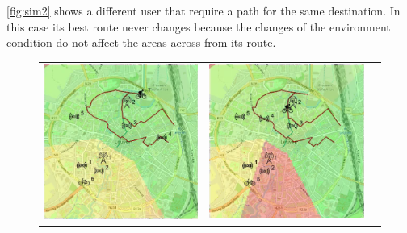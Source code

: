 \noindent \autoref{fig:sim2} shows a different user that require a path for the same destination. In this case its best route never changes because the changes of the environment condition do not affect the areas across from its route.
% 
\begin{figure}[h]
    \centering
    \begin{tabular}{lll}
         \includegraphics[scale=0.42]{figures/sim2snap1.png}  &
         \includegraphics[scale=0.42]{figures/sim2snap2.png} &

\end{tabular}
\end{figure}
